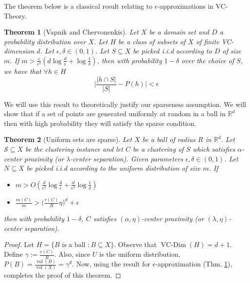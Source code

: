 \documentclass{article}
\newtheorem{theorem}{Theorem}
\newcommand{\mb}{\mathbb}
\newcommand{\mc}{\mathcal}
\DeclareMathOperator{\vcdim}{VC-Dim}
\DeclareMathOperator{\vol}{vol}
\begin{document}
The theorem below is a classical result relating to $\epsilon$-approximations in VC-Theory.
\begin{theorem}[Vapnik and Chervonenkis]
\label{theorem:vceapprox}
Let $X$ be a domain set and $D$ a probability distribution over $X$. Let $H$ be a class of subsets of $X$ of finite VC-dimension $d$. Let $\epsilon, \delta \in (0,1)$. Let $S \subseteq X$ be picked i.i.d according to $D$ of size $m$. If $m > \frac{c}{\epsilon^2}(d\log \frac{d}{\epsilon}+\log\frac{1}{\delta})$, then  with probability $1-\delta$ over the choice of $S$, we have that $\forall h \in H$
$$\bigg|\frac{|h\cap S|}{|S|} - P(h)\bigg| < \epsilon$$
\end{theorem}

We will use this result to theoretically justify our sparseness assumption. We will show that if a set of points are generated uniformly at random in a ball in $\mb R^d$ then with high probability they will satisfy the sparse condition. 

\begin{theorem}[Uniform sets are sparse]
\label{theorem:sparse}
Let $X$ be a ball of radius $R$ in $\mb R^d$. Let $\mc S \subseteq X$ be the clustering instance and let $C$ be a clustering of $S$ which satisfies $\alpha$-center proximity (or $\lambda$-center separation). Given parameters $\epsilon, \delta \in (0,1)$. Let $N \subseteq X$ be picked i.i.d according to the uniform distribution of size $m$. If 
\begin{itemize}
\item $m > O(\frac{d}{\epsilon^2}\log \frac{d}{\epsilon}+\frac{d}{\epsilon^2}\log\frac{1}{\delta})$
\item $\frac{m(C)}{m}> \Big(\frac{r(C)}{R}\eta\Big)^d + \epsilon$ 
\end{itemize}
then  with probability $1-\delta$, $C$ satisfies $(\alpha, \eta)$-center proximity (or $(\lambda, \eta)$-center separation).
\end{theorem}
\begin{proof}
Let $H = \{B \text{ is a ball }: B \subseteq X\}$. Observe that $\vcdim(H) = d+1$. Define $\gamma := \frac{r(C)}{R}$. Also, since $U$ is the uniform distribution, $P(B) = \frac{\vol(B)}{\vol(X)} = \gamma^d$. Now, using the result for $\epsilon$-approximation (Thm. \ref{theorem:vceapprox}), completes the proof of this theorem.
\end{proof}
\end{document}
